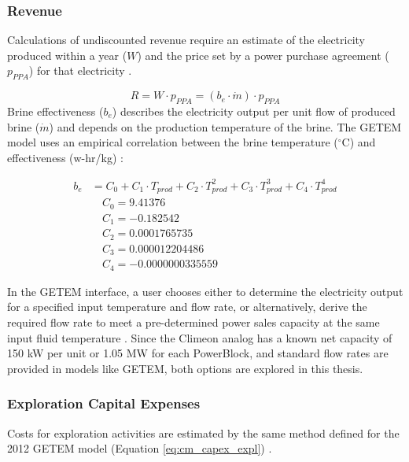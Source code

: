 \subsubsection{Revenue}\label{ch4:cm_rev}
Calculations of undiscounted revenue require an estimate of the electricity produced within a year ($W$) and the price set by a power purchase agreement ($p_{PPA}$) for that electricity \citep{entingh_volume_2006}. 

\begin{equation}
    \label{eq:cm_rev}
    R = W \cdot p_{PPA} = (b_e \cdot \dot{m}) \cdot p_{PPA}
\end{equation}
Brine effectiveness ($b_e$) describes the electricity output per unit flow of produced brine ($\dot{m}$) and depends on the production temperature of the brine. The GETEM model uses an empirical correlation between the brine temperature ($^\circ$C) and effectiveness (w-hr/kg) \citep[p.\ 62]{entingh_volume_2006}:

\begin{equation}
\begin{aligned}
    \label{eq:brine_eff}
    b_e &= C_0 + C_1 \cdot T_{prod} + C_2 \cdot T_{prod}^2 + C_3 \cdot T_{prod}^3 + C_4 \cdot T_{prod}^4 \\
    &\quad C_0 = 9.41376 \\
    &\quad C_1 = -0.182542 \\
    &\quad C_2 = 0.0001765735 \\
    &\quad C_3 = 0.000012204486 \\
    &\quad C_4 = -0.0000000335559
\end{aligned}
\end{equation}

In the GETEM interface, a user chooses either to determine the electricity output for a specified input temperature and flow rate, or alternatively, derive the required flow rate to meet a pre-determined power sales capacity at the same input fluid temperature \citep{entingh_volume_2006}. Since the Climeon analog has a known net capacity of 150 kW per unit or 1.05 MW for each PowerBlock, and standard flow rates are provided in models like GETEM, both options are explored in this thesis.

\subsubsection{Exploration Capital Expenses}\label{ch4:cm_capex_expl}
Costs for exploration activities are estimated by the same method defined for the 2012 GETEM model (Equation \ref{eq:cm_capex_expl}) \citep{eere_getem_2012}. 

